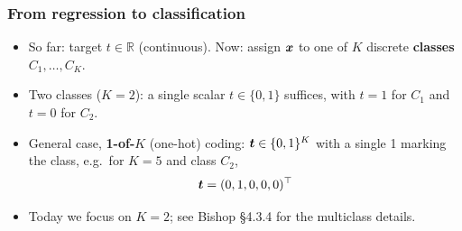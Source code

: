 \documentclass[10pt]{beamer}
\begin{document}
\begin{frame}[fragile]
\frametitle{From regression to classification}

\begin{itemize}
\item So far: target $t \in \mathbb{R}$ (continuous). Now: assign
  $\boldsymbol{x}$ to one of $K$ discrete \textbf{classes} $C_1,\dots,C_K$.
\item Two classes ($K{=}2$): a single scalar $t\in\{0,1\}$ suffices,
  with $t{=}1$ for $C_1$ and $t{=}0$ for $C_2$.
\item General case, \textbf{1-of-$K$} (one-hot) coding: $\boldsymbol{t} \in
  \{0,1\}^K$ with a single 1 marking the class, e.g.\ for $K{=}5$ and
  class $C_2$,
\[
\boldsymbol{t} = (0,1,0,0,0)^\top
\]
\item[$\Rightarrow$] Today we focus on $K{=}2$; see Bishop \S4.3.4 for
  the multiclass details.
\end{itemize}


\end{frame}
\end{document}
